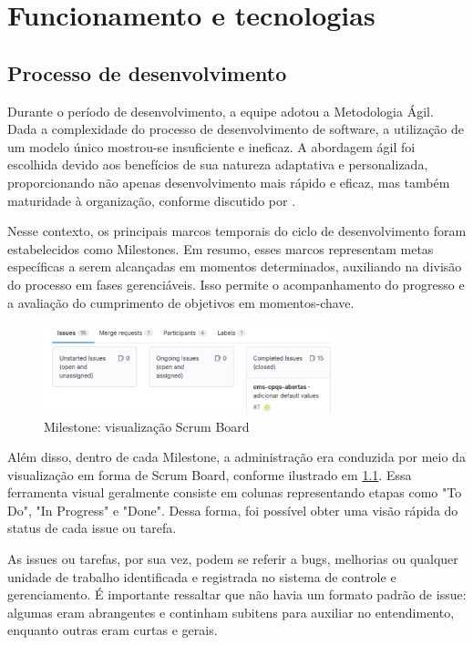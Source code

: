 \chapter{Funcionamento e tecnologias}
\label{chap:funcionamento}

\enlargethispage{-.5\baselineskip}

\section{Processo de desenvolvimento}
   Durante o período de desenvolvimento, a equipe adotou a Metodologia Ágil. Dada a complexidade do processo de desenvolvimento de software, a utilização de um modelo único mostrou-se insuficiente e ineficaz. A abordagem ágil foi escolhida devido aos benefícios de sua natureza adaptativa e personalizada, proporcionando não apenas desenvolvimento mais rápido e eficaz, mas também maturidade à organização, conforme discutido por \cite{8229928}.

    Nesse contexto, os principais marcos temporais do ciclo de desenvolvimento foram estabelecidos como Milestones. Em resumo, esses marcos representam metas específicas a serem alcançadas em momentos determinados, auxiliando na divisão do processo em fases gerenciáveis. Isso permite o acompanhamento do progresso e a avaliação do cumprimento de objetivos em momentos-chave.

   \begin{figure}[!htb]
       \centering
       \includegraphics[width=0.75\textwidth]{figuras/milestones.pdf}
       \caption{Milestone: visualização Scrum Board}
       \label{milestones}
    \end{figure}

 Além disso, dentro de cada Milestone, a administração era conduzida por meio da visualização em forma de Scrum Board, conforme ilustrado em \ref{milestones}. Essa ferramenta visual geralmente consiste em colunas representando etapas como "To Do", "In Progress" e "Done". Dessa forma, foi possível obter uma visão rápida do status de cada issue ou tarefa.

As issues ou tarefas, por sua vez, podem se referir a bugs, melhorias ou qualquer unidade de trabalho identificada e registrada no sistema de controle e gerenciamento. É importante ressaltar que não havia um formato padrão de issue: algumas eram abrangentes e continham subitens para auxiliar no entendimento, enquanto outras eram curtas e gerais.

